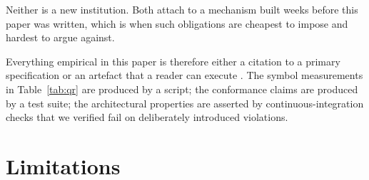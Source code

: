 \documentclass[10pt,a4paper,twocolumn]{article}
\begin{document}
\noindent Neither is a new institution. Both attach to a mechanism built weeks
before this paper was written, which is when such obligations are cheapest to
impose and hardest to argue against.

Everything empirical in this paper is therefore either a citation to a primary
specification or an artefact that a reader can execute
\citep{khsqr2026repo}. The symbol measurements in Table~\ref{tab:qr} are
produced by a script; the conformance claims are produced by a test suite; the
architectural properties are asserted by continuous-integration checks that we
verified fail on deliberately introduced violations.

\section{Limitations}
\label{sec:limits}
\end{document}
